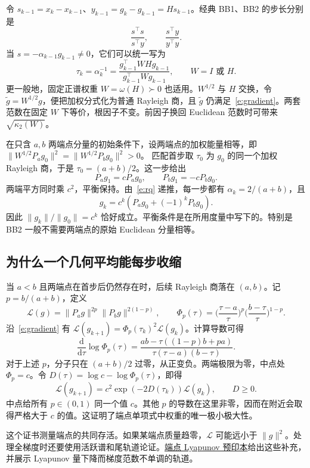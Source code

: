 \documentclass[UTF8,zihao=-4,a4paper]{ctexart}
\newcommand{\dd}{\mathrm d}
\newcommand{\norm}[1]{\lVert #1\rVert}
\begin{document}
令 $s_{k-1}=x_k-x_{k-1}$、$y_{k-1}=g_k-g_{k-1}=Hs_{k-1}$。经典 BB1、BB2 的步长分别是
\[
 \frac{s^\top s}{s^\top y},\qquad
 \frac{s^\top y}{y^\top y}.
\]
当 $s=-\alpha_{k-1}g_{k-1}\ne0$，它们可以统一写为
\begin{equation}\label{e:rq}
 \tau_k=\alpha_k^{-1}
 =\frac{g_{k-1}^\top WHg_{k-1}}{g_{k-1}^\top Wg_{k-1}},
 \qquad W=I\text{ 或 }H.
\end{equation}
更一般地，固定正谱权重 $W=\omega(H)\succ0$ 也适用。$W^{1/2}$ 与 $H$ 交换，令 $\widetilde g=W^{1/2}g$，便把加权分式化为普通 Rayleigh 商，且 $\widetilde g$ 仍满足~\eqref{e:gradient}。两套范数在固定 $W$ 下等价，根因子不变。前因子换回 Euclidean 范数时可带来 $\sqrt{\kappa_2(W)}$。

在只含 $a,b$ 两端点分量的初始条件下，设两端点的加权能量相等，即
$\norm{W^{1/2}P_a g_0}^2=\norm{W^{1/2}P_b g_0}^2>0$。
匹配首步取 $\tau_0$ 为 $g_0$ 的同一个加权 Rayleigh 商，于是 $\tau_0=(a+b)/2$。这一步给出
\[
 P_ag_1=cP_ag_0,\qquad P_bg_1=-cP_bg_0 .
\]
两端平方同时乘 $c^2$，平衡保持。由~\eqref{e:rq} 递推，每一步都有 $\alpha_k=2/(a+b)$，且
\begin{equation}\label{e:orbit}
 g_k=c^k(P_ag_0+(-1)^kP_bg_0).
\end{equation}
因此 $\norm{g_k}/\norm{g_0}=c^k$ 恰好成立。平衡条件是在所用度量中写下的。特别是 BB2 一般不需要两端点的原始 Euclidean 分量相等。

\subsection{为什么一个几何平均能每步收缩}

当 $a<b$ 且两端点在首步后仍然存在时，后续 Rayleigh 商落在 $(a,b)$。记 $p=b/(a+b)$，定义
\[
 \mathcal L(g)=\norm{P_a g}^{2p}\norm{P_b g}^{2(1-p)},\qquad
 \Phi_p(\tau)
 =\Big(\frac{\tau-a}{\tau}\Big)^p
  \Big(\frac{b-\tau}{\tau}\Big)^{1-p}.
\]
沿~\eqref{e:gradient} 有 $\mathcal L(g_{k+1})=\Phi_p(\tau_k)^2\mathcal L(g_k)$。计算导数可得
\[
 \frac{\dd}{\dd\tau}\log\Phi_p(\tau)
 =\frac{ab-\tau((1-p)b+pa)}{\tau(\tau-a)(b-\tau)} .
\]
对于上述 $p$，分子只在 $(a+b)/2$ 过零，从正变负。两端极限为零，中点处 $\Phi_p=c$。令 $D(\tau)=\log c-\log\Phi_p(\tau)$，即得
\[
 \mathcal L(g_{k+1})=c^2\exp(-2D(\tau_k))\mathcal L(g_k),\qquad D\ge0 .
\]
中点给所有 $p\in(0,1)$ 同一个值 $c$。其他 $p$ 的导数在这里非零，因而在附近会取得严格大于 $c$ 的值。这证明了端点单项式中权重的唯一极小极大性。

这个证书测量端点的共同存活。如果某端点质量趋零，$\mathcal L$ 可能远小于 $\norm g^2$。处理全梯度时还要使用活跃谱和尾轨道论证。\href{https://arxiv.org/abs/2609.12084}{端点 Lyapunov 预印本}给出这些补充，并展示 Lyapunov 量下降而梯度范数不单调的轨道。
\end{document}
